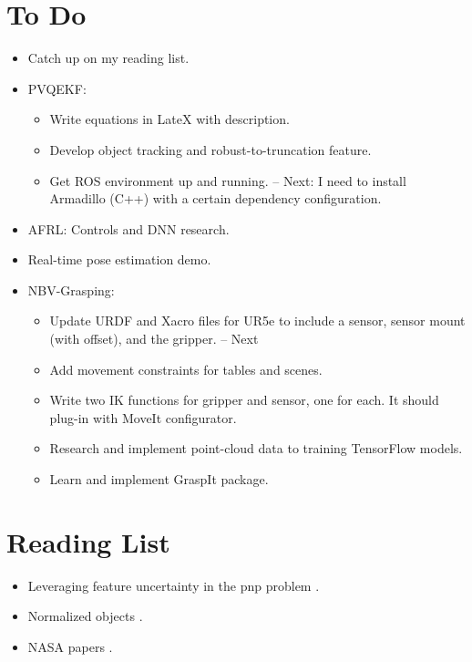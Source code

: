 \documentclass[11pt]{article}
\begin{document}
\section{To Do}
\begin{itemize}
  \item Catch up on my reading list.
  \item PVQEKF:
  \begin{itemize}
      \item Write equations in LateX with description.
      \item Develop object tracking and robust-to-truncation feature.
      \item Get ROS environment up and running. -- Next: I need to install Armadillo (C++) with a certain dependency configuration.
  \end{itemize}
  \item AFRL: Controls and DNN research.
  \item Real-time pose estimation demo.
  \item NBV-Grasping:
      \begin{itemize}
      \item Update URDF and Xacro files for UR5e to include a sensor, sensor mount (with offset), and the gripper. -- Next
      \item Add movement constraints for tables and scenes.
      \item Write two IK functions for gripper and sensor, one for each. It should plug-in with MoveIt configurator.
      \item Research and implement point-cloud data to training TensorFlow models.
      \item Learn and implement GraspIt package.
      \end{itemize}
\end{itemize}

\section{Reading List}
\begin{itemize}
      \item Leveraging feature uncertainty in the pnp problem \cite{ferraz2014leveraging}.
      \item Normalized objects \cite{Wang_2019_CVPR}.
      \item NASA papers \cite{NASATech44:online}.
\end{itemize}
\end{document}
